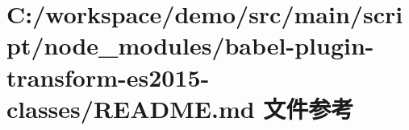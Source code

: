 \hypertarget{node__modules_2babel-plugin-transform-es2015-classes_2_r_e_a_d_m_e_8md}{}\section{C\+:/workspace/demo/src/main/script/node\+\_\+modules/babel-\/plugin-\/transform-\/es2015-\/classes/\+R\+E\+A\+D\+ME.md 文件参考}
\label{node__modules_2babel-plugin-transform-es2015-classes_2_r_e_a_d_m_e_8md}
